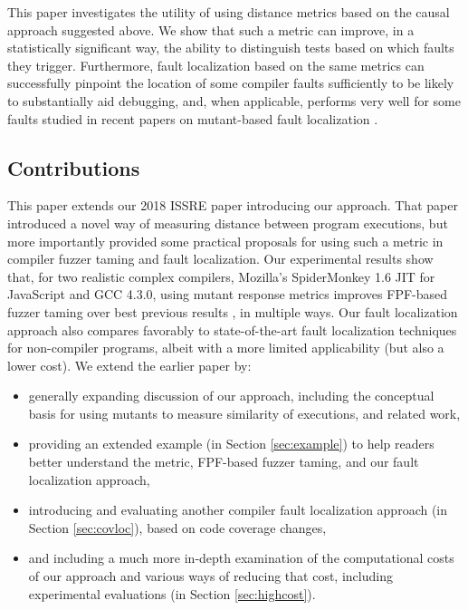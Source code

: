 This paper investigates the utility of using distance metrics based on the causal approach suggested above.  We show that such a metric can improve, in a statistically significant way, the ability to distinguish tests based on which faults they trigger.  Furthermore, fault localization based on the same metrics can successfully pinpoint the location of some compiler faults sufficiently to be likely to substantially aid debugging, and, when applicable, performs very well for some faults studied in recent papers on mutant-based fault localization \cite{multilingual,Papadakis}.

\subsection{Contributions}

This paper extends our 2018 ISSRE paper \cite{ISSRE18Mutants} introducing our approach. That paper introduced a novel way of measuring distance between program executions, but more importantly provided some practical proposals for using such a metric in compiler fuzzer taming and fault localization.  Our experimental results show that, for two realistic complex compilers, Mozilla's SpiderMonkey 1.6 JIT for JavaScript and GCC 4.3.0, using mutant response metrics improves FPF-based fuzzer taming over best previous results \cite{PLDI13}, in multiple ways.  Our fault localization approach also compares favorably to state-of-the-art fault localization techniques \cite{MUSE,multilingual,Metallaxis} for non-compiler programs, albeit with a more limited applicability (but also a lower cost).  We extend the earlier paper by:

\begin{itemize}
\item generally expanding discussion of our approach, including the conceptual basis for using mutants to measure similarity of executions, and related work,
\item providing an extended example (in Section \ref{sec:example}) to help readers better understand the metric, FPF-based fuzzer taming, and our fault localization approach,
\item introducing and evaluating another compiler fault localization approach (in Section \ref{sec:covloc}), based on code coverage changes,
\item and including a much more in-depth examination of the computational costs of our approach and various ways of reducing that cost, including experimental evaluations (in Section \ref{sec:highcost}).
\end{itemize}